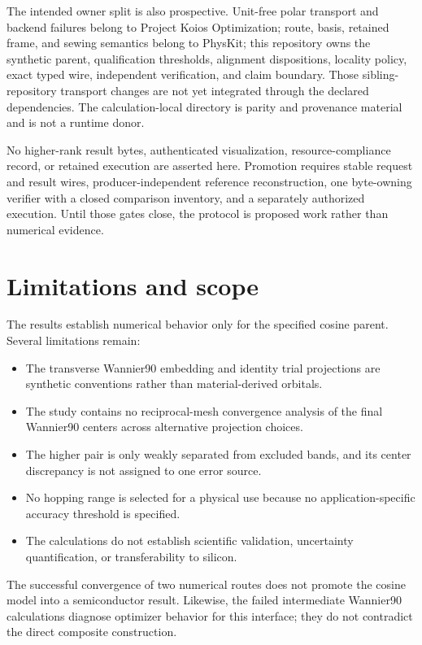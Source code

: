The intended owner split is also prospective.  Unit-free polar transport and
backend failures belong to Project Koios Optimization; route, basis, retained
frame, and sewing semantics belong to PhysKit; this repository owns the
synthetic parent, qualification thresholds, alignment dispositions, locality
policy, exact typed wire, independent verification, and claim boundary.  Those
sibling-repository transport changes are not yet integrated through the
declared dependencies.  The calculation-local  directory is
parity and provenance material and is not a runtime donor.

No higher-rank result bytes, authenticated visualization, resource-compliance
record, or retained execution are asserted here.  Promotion requires stable
request and result wires, producer-independent reference reconstruction, one
byte-owning verifier with a closed comparison inventory, and a separately
authorized execution.  Until those gates close, the protocol is proposed work
rather than numerical evidence.

\section{Limitations and scope}

The results establish numerical behavior only for the specified cosine parent.
Several limitations remain:
\begin{itemize}
    \item The transverse Wannier90 embedding and identity trial projections are
          synthetic conventions rather than material-derived orbitals.
    \item The study contains no reciprocal-mesh convergence analysis of the
          final Wannier90 centers across alternative projection choices.
    \item The higher pair is only weakly separated from excluded bands, and its
          center discrepancy is not assigned to one error source.
    \item No hopping range is selected for a physical use because no
          application-specific accuracy threshold is specified.
    \item The calculations do not establish scientific validation,
          uncertainty quantification, or transferability to silicon.
\end{itemize}
The successful convergence of two numerical routes does not promote the cosine
model into a semiconductor result. Likewise, the failed intermediate Wannier90
calculations diagnose optimizer behavior for this interface; they do not
contradict the direct composite
construction.

